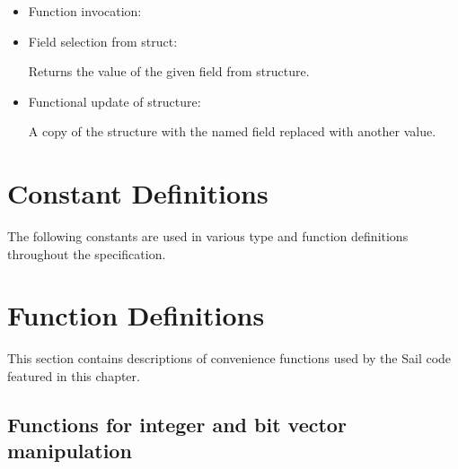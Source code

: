 \begin{itemize}
\item Function invocation:


\item Field selection from struct:


Returns the value of the given field from structure.

\item Functional update of structure:


A copy of the structure with the named field replaced with another value.

\end{itemize}

\section{Constant Definitions}
The following constants are used in various type and function definitions throughout the specification.

\medskip
\label{sailRISCVzxlen}
\sailRISCVtypecapAddrWidth{}
\sailRISCVtypecapLenWidth{}
\sailRISCVtypecapSizze{}
\sailRISCVtypecapBWidth{}


\section{Function Definitions}

This section contains descriptions of convenience functions used by the Sail code featured in this chapter.

\subsection*{Functions for integer and bit vector manipulation}

